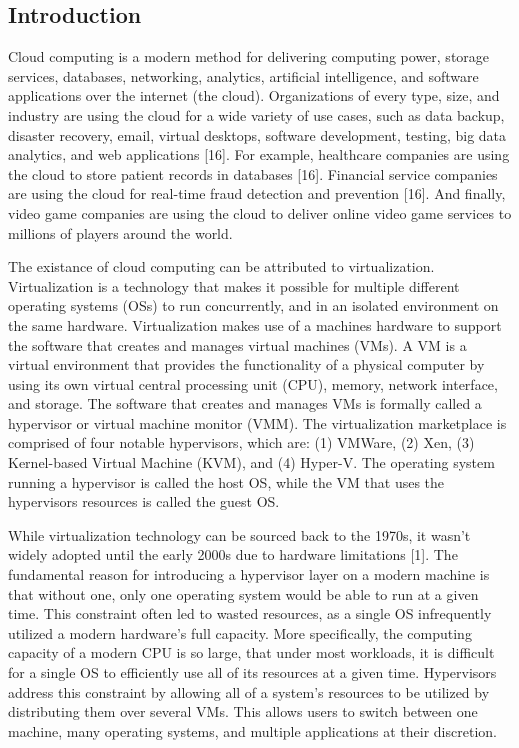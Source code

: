 \documentclass{report}
\begin{document}
\begin{spacing}{1.5}


\newpage
\chapter{Introduction}


{\large
Cloud computing is a modern method for delivering computing power, storage services, databases, networking, analytics, artificial intelligence, and software applications over the internet (the cloud). Organizations of every type, size, and industry are using the cloud for a wide variety of use cases, such as data backup, disaster recovery, email, virtual desktops, software development, testing, big data analytics, and web applications [16]. For example, healthcare companies are using the cloud to store patient records in databases [16]. Financial service companies are using the cloud for real-time fraud detection and prevention [16]. And finally, video game companies are using the cloud to deliver online video game services to millions of players around the world.
\newline
}

{\large
The existance of cloud computing can be attributed to virtualization. Virtualization is a technology that makes it possible for multiple different operating systems (OSs) to run concurrently, and in an isolated environment on the same hardware. Virtualization makes use of a machines hardware to support the software that creates and manages virtual machines (VMs). A VM is a virtual environment that provides the functionality of a physical computer by using its own virtual central processing unit (CPU), memory, network interface, and storage. The software that creates and manages VMs is formally called a hypervisor or virtual machine monitor (VMM). The virtualization marketplace is comprised of four notable hypervisors, which are: (1) VMWare, (2) Xen, (3) Kernel-based Virtual Machine (KVM), and (4) Hyper-V. The operating system running a hypervisor is called the host OS, while the VM that uses the hypervisors resources is called the guest OS.
\newline
}

{\large
While virtualization technology can be sourced back to the 1970s, it wasn’t widely adopted until the early 2000s due to hardware limitations [1]. The fundamental reason for introducing a hypervisor layer on a modern machine is that without one, only one operating system would be able to run at a given time. This constraint often led to wasted resources, as a single OS infrequently utilized a modern hardware’s full capacity. More specifically, the computing capacity of a modern CPU is so large, that under most workloads, it is difficult for a single OS to efficiently use all of its resources at a given time. Hypervisors address this constraint by allowing all of a system’s resources to be utilized by distributing them over several VMs. This allows users to switch between one machine, many operating systems, and multiple applications at their discretion.
\newline
}



\end{spacing}
\end{document}
